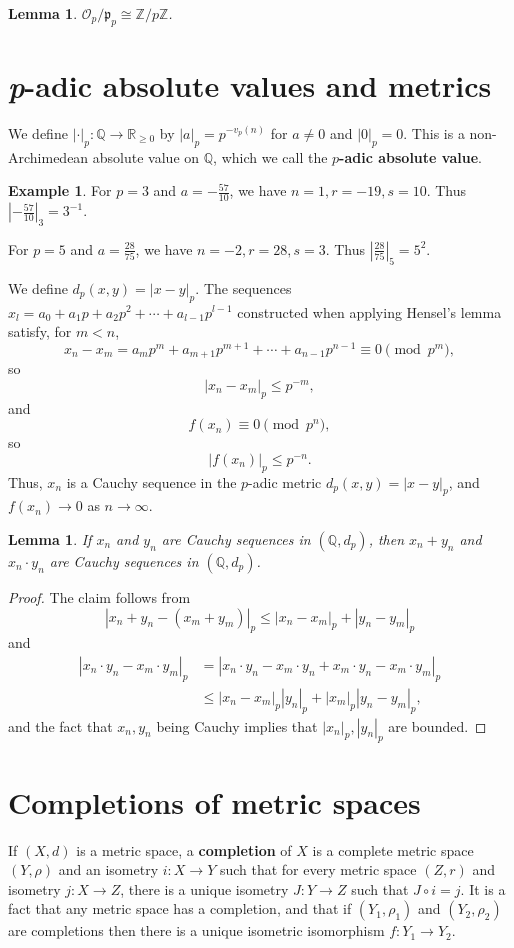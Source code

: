 \documentclass{article}
\theoremstyle{plain}
\newtheorem{lemma}[theorem]{Lemma}
\theoremstyle{definition}
\newtheorem{example}[theorem]{Example}
\begin{document}
\begin{lemma}
$\mathcal{O}_p/\mathfrak{p}_p \cong \mathbb{Z}/p\mathbb{Z}$.
\end{lemma}


\section{{\em p}-adic absolute values and metrics}
We define $|\cdot|_p:\mathbb{Q} \to \mathbb{R}_{\geq 0}$ by $|a|_p=p^{-v_p(n)}$ for $a \neq 0$ and $|0|_p=0$. 
This is a non-Archimedean absolute value on $\mathbb{Q}$, which we call
 the \textbf{$p$-adic absolute value}. 

\begin{example}
For 
$p=3$ and 
$a=-\frac{57}{10}$,
we have $n=1, r=-19, s=10$. 
Thus
$\left|-\frac{57}{10}\right|_3=3^{-1}$.

For $p=5$ and $a=\frac{28}{75}$, we have $n=-2, r=28, s=3$. Thus 
$\left| \frac{28}{75} \right|_5 = 5^2$.
\end{example}

We define $d_p(x,y)=|x-y|_p$.  The sequences $x_l = a_0+a_1p+a_2p^2+\cdots+a_{l-1} p^{l-1}$ constructed when applying Hensel's
lemma satisfy, for $m < n$,
\[
x_n-x_m = a_mp^m+a_{m+1}p^{m+1}+\cdots
+a_{n-1}p^{n-1} \equiv 0 \pmod{p^m},
\]
so
\[
|x_n-x_m|_p \leq p^{-m},
\]
and 
\[
f(x_n) \equiv 0 \pmod{p^n},
\]
so
\[
|f(x_n)|_p \leq p^{-n}.
\]
Thus, $x_n$ is a Cauchy sequence in the $p$-adic metric $d_p(x,y)=|x-y|_p$, and 
$f(x_n) \to 0$ as $n \to \infty$. 

\begin{lemma}
If $x_n$ and $y_n$ are  Cauchy sequences
in $(\mathbb{Q},d_p)$, then $x_n+y_n$ and $x_n\cdot y_n$ are Cauchy sequences in
$(\mathbb{Q},d_p)$.
\label{cauchysum}
\end{lemma}
\begin{proof}
The claim follows from
\[
|x_n+y_n-(x_m+y_m)|_p
\leq |x_n-x_m|_p + |y_n-y_m|_p
\]
and
\begin{align*}
|x_n\cdot y_n - x_m\cdot y_m|_p &=|x_n \cdot y_n - x_m \cdot y_n
+x_m\cdot y_n  - x_m \cdot y_m|_p\\
&\leq |x_n-x_m|_p |y_n|_p + |x_m|_p |y_n-y_m|_p,
\end{align*}
and the fact that $x_n,y_n$ being Cauchy implies that $|x_n|_p,|y_n|_p$ are bounded. 
\end{proof}


\section{Completions of metric spaces}
If $(X,d)$ is a metric space, a \textbf{completion} of $X$ is a complete metric space $(Y,\rho)$ and an
isometry $i:X \to Y$ such that for every metric space $(Z,r)$ and isometry $j:X \to Z$, there is a unique
isometry $J:Y \to Z$ such that $J \circ i = j$. It is a fact that any metric space has a completion,
and that if $(Y_1,\rho_1)$ and $(Y_2,\rho_2)$ are completions then there is a unique
isometric isomorphism $f:Y_1 \to Y_2$. 
\end{document}
